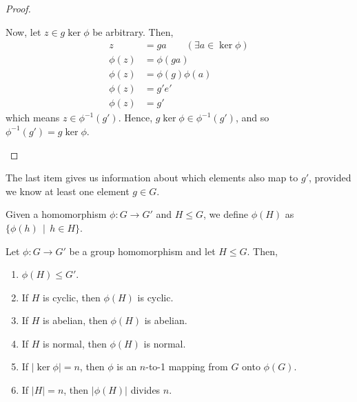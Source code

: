 \begin{proof}
\begin{enumerate}
            Now, let \(z\in g\ker\phi\) be arbitrary. Then,
            \begin{align*}
                z &= ga \qquad (\exists a\in\ker\phi) \\
                \phi(z) &= \phi(ga) \\
                \phi(z) &= \phi(g)\phi(a) \\
                \phi(z) &= g'e' \\
                \phi(z) &= g'
            \end{align*}
            which means \(z\in \phi^{-1}(g')\). Hence, \(g\ker\phi \in \phi^{-1}(g')\), and so \(\phi^{-1}(g') = g\ker\phi\).
        \end{enumerate}
    \end{proof}

    The last item gives us information about which elements also map to \(g'\), provided we know at least one element \(g\in G\).

    \begin{note}
        Given a homomorphism \(\phi : G \to G'\) and \(H \leq G\), we define \(\phi(H)\) as \(\{\phi(h) \,\mid\, h\in H\}\).
    \end{note}

    \begin{thm}
        Let \(\phi : G \to G'\) be a group homomorphism and let \(H \leq G\). Then,
        \begin{enumerate}
            \item \(\phi(H) \leq G'\).
            \item If \(H\) is cyclic, then \(\phi(H)\) is cyclic.
            \item If \(H\) is abelian, then \(\phi(H)\) is abelian.
            \item If \(H\) is normal, then \(\phi(H)\) is normal.
            \item If \(|\ker\phi| = n\), then \(\phi\) is an \(n\)-to-1 mapping from \(G\) onto \(\phi(G)\).
            \item If \(|H| = n\), then \(|\phi(H)|\) divides \(n\).
        \end{enumerate}
    \end{thm}

